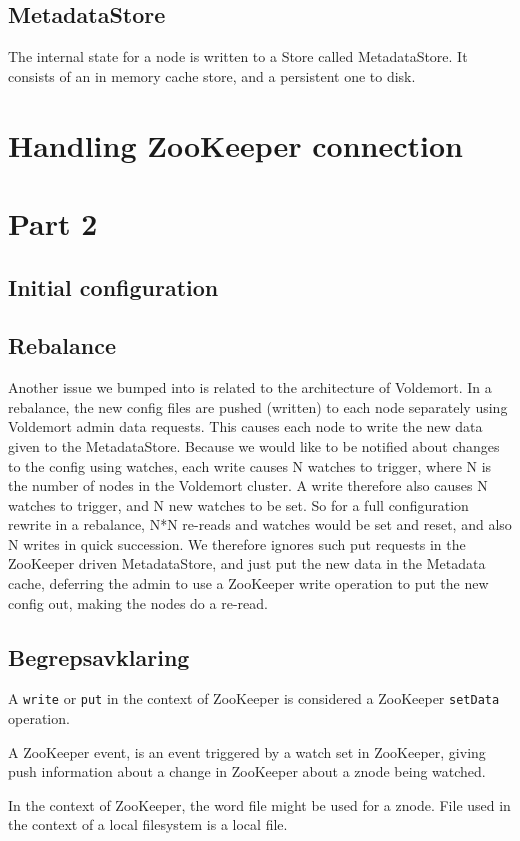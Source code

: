 \subsection{MetadataStore}
The internal state for a node is written to a Store called MetadataStore. It consists of an in memory cache store, and a persistent one to disk. 

\section{Handling ZooKeeper connection}


\section{Part 2}

\subsection{Initial configuration}


\subsection{Rebalance}
Another issue we bumped into is related to the architecture of Voldemort.
In a rebalance, the new config files are pushed (written) to each node separately using Voldemort admin data requests. This causes each node to write the new data given to the MetadataStore.
Because we would like to be notified about changes to the config using watches, each write causes N watches to trigger, where N is the number of nodes in the Voldemort cluster.
A write therefore also causes N watches to trigger, and N new watches to be set. So for a full configuration rewrite in a rebalance, N*N re-reads and watches would be set and reset, and also N writes in quick succession.
We therefore ignores such put requests in the ZooKeeper driven MetadataStore, and just put the new data in the Metadata cache, deferring the admin to use a ZooKeeper write operation to put the new config out, making the nodes do a re-read.


\subsection{Begrepsavklaring}
A \texttt{write} or \texttt{put} in the context of ZooKeeper is considered a ZooKeeper \texttt{setData} operation.

A ZooKeeper event, is an event triggered by a watch set in ZooKeeper, giving push information about a change in ZooKeeper about a znode being watched.

In the context of ZooKeeper, the word file might be used for a znode. File used in the context of a local filesystem is a local file.


